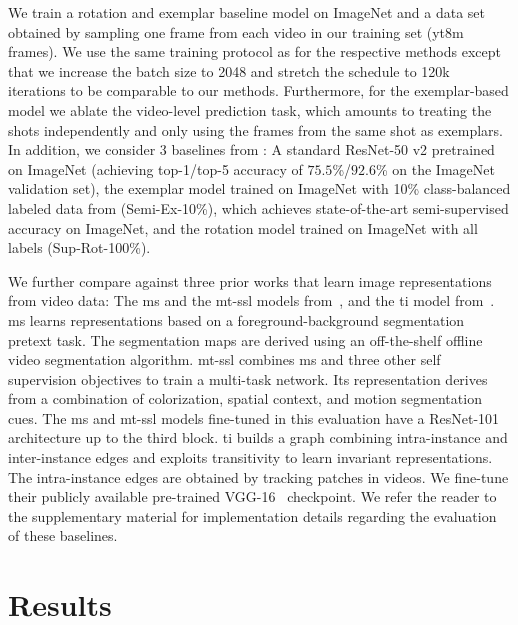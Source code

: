 \documentclass[10pt,twocolumn,letterpaper]{article}
\renewcommand{\paragraph}[1]{\noindent{\bf #1}\quad}
\begin{document}
\paragraph{Baselines} We train a rotation and exemplar baseline model on ImageNet and a data set obtained by sampling one frame from each video in our training set (\gls{yt8m} frames). We use the same training protocol as \cite{kolesnikov2019revisiting} for the respective methods except that we increase the batch size to 2048 and stretch the schedule to 120k iterations to be comparable to our methods. Furthermore, for the exemplar-based model we ablate the video-level prediction task, which amounts to treating the shots independently and only using the frames from the same shot as exemplars. In addition, we consider 3 baselines from \cite{zhai2019visual}: A standard ResNet-50 v2 pretrained on ImageNet (achieving top-1/top-5 accuracy of $75.5$\%/$92.6$\% on the ImageNet validation set), the exemplar model trained on ImageNet with 10\% class-balanced labeled data from \cite{zhai2019s4l} (Semi-Ex-10\%), which achieves state-of-the-art semi-supervised accuracy on ImageNet, and the rotation model trained on ImageNet with all labels \cite{zhai2019s4l} (Sup-Rot-100\%).

We further compare against three prior works that learn image representations from video data: The \gls{ms} \cite{pathak2017learning} and the \gls{mt-ssl} models from~\cite{doersch2017multi}, and the \gls{ti} model from~\cite{wang2017transitive}. \gls{ms} learns representations based on a foreground-background segmentation pretext task. The segmentation maps are derived using an off-the-shelf offline video segmentation algorithm. \gls{mt-ssl} combines \gls{ms} and three other self supervision objectives to train a multi-task network.
Its representation derives from a combination of colorization, spatial context, and motion segmentation cues.
The \gls{ms} and \gls{mt-ssl} models fine-tuned in this evaluation have a ResNet-101~\cite{he2016deep} architecture up to the third block.
\gls{ti} builds a graph combining intra-instance and inter-instance edges and exploits transitivity to learn invariant representations. The intra-instance edges are obtained by tracking patches in videos.
We fine-tune their publicly available pre-trained VGG-16~\cite{simonyan2014very} checkpoint.
We refer the reader to the supplementary material for implementation details regarding the evaluation of these baselines.

\section{Results}
\end{document}
